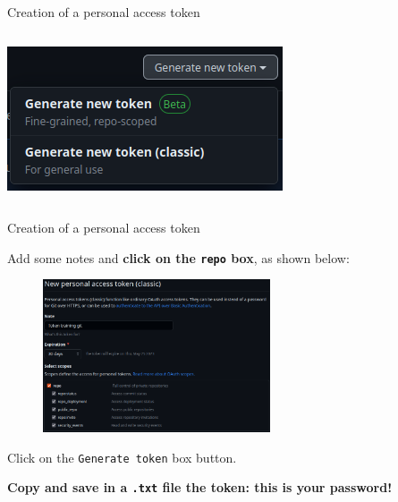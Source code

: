 \documentclass[10pt]{beamer}
\begin{document}
\begin{frame}[fragile]{Creation of a personal access token}
\begin{columns}
\begin{column}{0.3\textwidth}
\begin{center}
     \includegraphics[width=\textwidth]{img/access-token-3.png}
     \end{center}
\end{column}
\end{columns}

\end{frame}

\begin{frame}[fragile]{Creation of a personal access token}
\protect\hypertarget{creation-of-a-personal-access-token-2}{}

Add some notes and \textbf{click on the \texttt{repo} box}, as shown
below:

\begin{figure}

{\centering \includegraphics[width=0.6\textwidth]{img/access-token-2.png}

}

\end{figure}

Click on the \texttt{Generate\ token} box button.

\textbf{Copy and save in a \texttt{.txt} file the token: this is your
password!} 
\end{frame}
\end{document}
